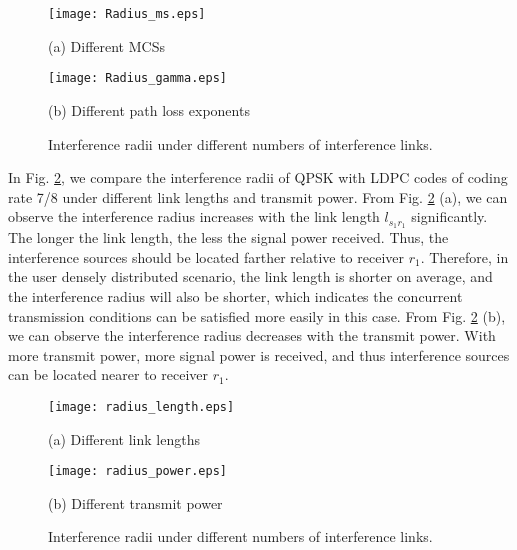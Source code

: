 \documentclass[journal]{IEEEtran}
\begin{document}
\begin{figure}[htbp]
\begin{minipage}[t]{0.5\linewidth}
\centering
\texttt{[image: Radius\_ms.eps]}
\centerline{\small (a) Different MCSs}
\end{minipage}\begin{minipage}[t]{0.5\linewidth}
\centering
\texttt{[image: Radius\_gamma.eps]}
\centerline{\small (b) Different path loss exponents}
\end{minipage}\caption{Interference radii under different numbers of interference links.}
\label{fig:infer_radii} \vspace*{-3mm}
\end{figure}

In Fig. \ref{fig:infer_radii_2}, we compare the interference radii of QPSK with LDPC codes of
coding rate 7/8 under different link lengths and transmit power. From Fig. \ref{fig:infer_radii_2}
(a), we can observe the interference radius increases with the link length $l_{{s_1}{r_1}}$
significantly. The longer the link length, the less the signal power received. Thus, the interference
sources should be located farther relative to receiver $r_1$. Therefore, in the user densely distributed scenario, the link length is shorter on average, and the interference radius will also be shorter, which indicates the concurrent transmission conditions can be satisfied more easily in this case. From Fig. \ref{fig:infer_radii_2}
(b), we can observe the interference radius decreases with the transmit power. With more transmit
power, more signal power is received, and thus interference sources can be located nearer to
receiver $r_1$.



\begin{figure}[htbp]
\begin{minipage}[t]{0.5\linewidth}
\centering
\texttt{[image: radius\_length.eps]}
\centerline{\small (a) Different link lengths }
\end{minipage}\begin{minipage}[t]{0.5\linewidth}
\centering
\texttt{[image: radius\_power.eps]}
\centerline{\small (b) Different transmit power}
\end{minipage}\caption{Interference radii under different numbers of interference links.}
\label{fig:infer_radii_2} \vspace*{-3mm}
\end{figure}
\end{document}
